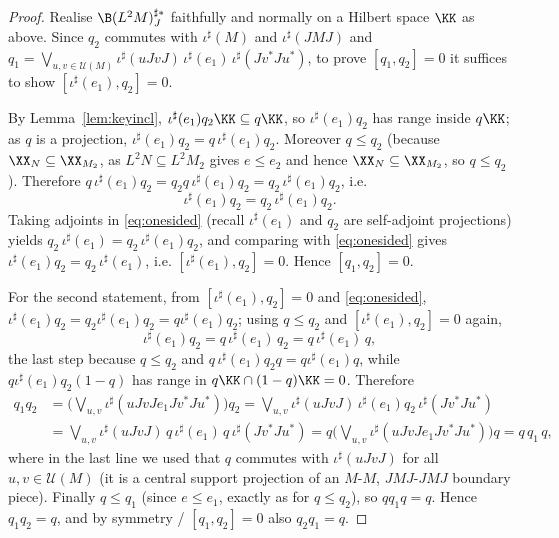 \begin{proof}
Realise $\B(L^2M)^{\sharp*}_J$ faithfully and normally on a Hilbert space $\KK$ as above.
Since $q_2$ commutes with $\iota^\sharp(M)$ and $\iota^\sharp(JMJ)$ and
$q_1=\bigvee_{u,v\in\mathcal U(M)}\iota^\sharp(uJvJ)\,\iota^\sharp(e_1)\,\iota^\sharp(Jv^*Ju^*)$,
to prove $[q_1,q_2]=0$ it suffices to show $[\iota^\sharp(e_1),q_2]=0$.

By Lemma~\ref{lem:keyincl}, $\iota^\sharp(e_1)q_2\KK\subseteq q\KK$, so $\iota^\sharp(e_1)q_2$
has range inside $q\KK$; as $q$ is a projection,
$\iota^\sharp(e_1)q_2=q\,\iota^\sharp(e_1)q_2$. Moreover $q\le q_2$ (because
$\XX_N\subseteq\XX_{M_2}$, as $L^2N\subseteq L^2M_2$ gives $e\le e_2$ and hence
$\XX_N\subseteq\XX_{M_2}$, so $q\le q_2$). Therefore
$q\,\iota^\sharp(e_1)q_2=q_2 q\,\iota^\sharp(e_1)q_2=q_2\,\iota^\sharp(e_1)q_2$, i.e.
\begin{equation}\label{eq:onesided}
\iota^\sharp(e_1)q_2=q_2\,\iota^\sharp(e_1)q_2 .
\end{equation}
Taking adjoints in \eqref{eq:onesided} (recall $\iota^\sharp(e_1)$ and $q_2$ are self-adjoint
projections) yields $q_2\,\iota^\sharp(e_1)=q_2\,\iota^\sharp(e_1)q_2$, and comparing with
\eqref{eq:onesided} gives $\iota^\sharp(e_1)q_2=q_2\,\iota^\sharp(e_1)$, i.e.
$[\iota^\sharp(e_1),q_2]=0$. Hence $[q_1,q_2]=0$.

For the second statement, from $[\iota^\sharp(e_1),q_2]=0$ and \eqref{eq:onesided},
$\iota^\sharp(e_1)q_2=q_2\iota^\sharp(e_1)q_2=q\iota^\sharp(e_1)q_2$; using $q\le q_2$ and
$[\iota^\sharp(e_1),q_2]=0$ again,
\[
\iota^\sharp(e_1)q_2
= q\,\iota^\sharp(e_1)\,q_2
= q\,\iota^\sharp(e_1)\,q ,
\]
the last step because $q\le q_2$ and $q\,\iota^\sharp(e_1)q_2 q=q\iota^\sharp(e_1)q$, while
$q\iota^\sharp(e_1)q_2(1-q)$ has range in $q\KK\cap(1-q)\KK=0$. Therefore
\begin{align*}
q_1 q_2
&=\Big(\bigvee_{u,v}\iota^\sharp(uJvJe_1Jv^*Ju^*)\Big)q_2
 =\bigvee_{u,v}\iota^\sharp(uJvJ)\,\iota^\sharp(e_1)q_2\,\iota^\sharp(Jv^*Ju^*)\\
&=\bigvee_{u,v}\iota^\sharp(uJvJ)\,q\,\iota^\sharp(e_1)\,q\,\iota^\sharp(Jv^*Ju^*)
 = q\Big(\bigvee_{u,v}\iota^\sharp(uJvJe_1Jv^*Ju^*)\Big)q
 = q\,q_1\,q ,
\end{align*}
where in the last line we used that $q$ commutes with $\iota^\sharp(uJvJ)$ for all
$u,v\in\mathcal U(M)$ (it is a central support projection of an $M$-$M$, $JMJ$-$JMJ$
boundary piece). Finally $q\le q_1$ (since $e\le e_1$, exactly as for $q\le q_2$), so
$q q_1 q=q$. Hence $q_1q_2=q$, and by symmetry / $[q_1,q_2]=0$ also $q_2q_1=q$.
\end{proof}

